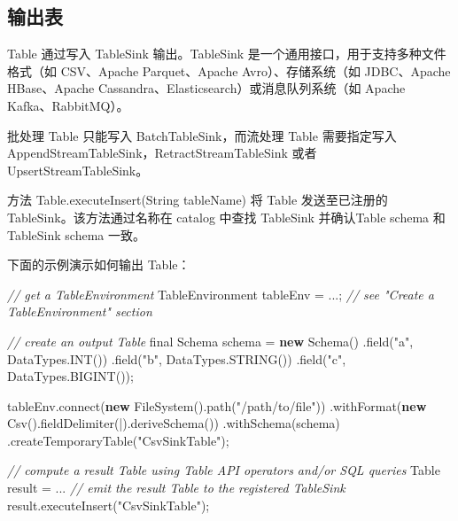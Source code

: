 \documentclass[cn,11pt,chinese]{elegantbook}
\newenvironment{Shaded}{}{}
\newcommand{\BuiltInTok}[1]{#1}
\newcommand{\CharTok}[1]{\textcolor[rgb]{0.25,0.44,0.63}{#1}}
\newcommand{\CommentTok}[1]{\textcolor[rgb]{0.38,0.63,0.69}{\textit{#1}}}
\newcommand{\DataTypeTok}[1]{\textcolor[rgb]{0.56,0.13,0.00}{#1}}
\newcommand{\FunctionTok}[1]{\textcolor[rgb]{0.02,0.16,0.49}{#1}}
\newcommand{\KeywordTok}[1]{\textcolor[rgb]{0.00,0.44,0.13}{\textbf{#1}}}
\newcommand{\NormalTok}[1]{#1}
\newcommand{\StringTok}[1]{\textcolor[rgb]{0.25,0.44,0.63}{#1}}
\begin{document}
\hypertarget{ux8f93ux51faux8868}{%
\subsection{输出表}\label{ux8f93ux51faux8868}}

Table 通过写入 TableSink 输出。TableSink
是一个通用接口，用于支持多种文件格式（如 CSV、Apache Parquet、Apache
Avro）、存储系统（如 JDBC、Apache HBase、Apache
Cassandra、Elasticsearch）或消息队列系统（如 Apache Kafka、RabbitMQ）。

批处理 Table 只能写入 BatchTableSink，而流处理 Table 需要指定写入
AppendStreamTableSink，RetractStreamTableSink 或者
UpsertStreamTableSink。

方法 Table.executeInsert(String tableName) 将 Table 发送至已注册的
TableSink。该方法通过名称在 catalog 中查找 TableSink 并确认Table schema
和 TableSink schema 一致。

下面的示例演示如何输出 Table：

\begin{Shaded}
\begin{Highlighting}[]
\CommentTok{// get a TableEnvironment}
\NormalTok{TableEnvironment tableEnv = ...; }\CommentTok{// see "Create a TableEnvironment" section}

\CommentTok{// create an output Table}
\DataTypeTok{final} \BuiltInTok{Schema}\NormalTok{ schema = }\KeywordTok{new} \BuiltInTok{Schema}\NormalTok{()}
\NormalTok{    .}\FunctionTok{field}\NormalTok{(}\StringTok{"a"}\NormalTok{, DataTypes.}\FunctionTok{INT}\NormalTok{())}
\NormalTok{    .}\FunctionTok{field}\NormalTok{(}\StringTok{"b"}\NormalTok{, DataTypes.}\FunctionTok{STRING}\NormalTok{())}
\NormalTok{    .}\FunctionTok{field}\NormalTok{(}\StringTok{"c"}\NormalTok{, DataTypes.}\FunctionTok{BIGINT}\NormalTok{());}

\NormalTok{tableEnv.}\FunctionTok{connect}\NormalTok{(}\KeywordTok{new} \FunctionTok{FileSystem}\NormalTok{().}\FunctionTok{path}\NormalTok{(}\StringTok{"/path/to/file"}\NormalTok{))}
\NormalTok{    .}\FunctionTok{withFormat}\NormalTok{(}\KeywordTok{new} \FunctionTok{Csv}\NormalTok{().}\FunctionTok{fieldDelimiter}\NormalTok{(}\CharTok{\textquotesingle{}|\textquotesingle{}}\NormalTok{).}\FunctionTok{deriveSchema}\NormalTok{())}
\NormalTok{    .}\FunctionTok{withSchema}\NormalTok{(schema)}
\NormalTok{    .}\FunctionTok{createTemporaryTable}\NormalTok{(}\StringTok{"CsvSinkTable"}\NormalTok{);}

\CommentTok{// compute a result Table using Table API operators and/or SQL queries}
\NormalTok{Table result = ...}
\CommentTok{// emit the result Table to the registered TableSink}
\NormalTok{result.}\FunctionTok{executeInsert}\NormalTok{(}\StringTok{"CsvSinkTable"}\NormalTok{);}
\end{Highlighting}
\end{Shaded}
\end{document}
